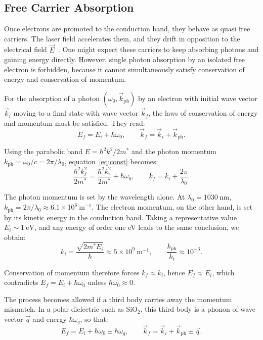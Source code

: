 \subsection{Free Carrier Absorption}

Once electrons are promoted to the conduction band, they behave as quasi free carriers. The laser field accelerates them, and they drift in opposition to the electrical field $\vec{E}$~\cite{mao2004}. One might expect these carriers to keep absorbing photons and gaining energy directly. However, single photon absorption by an isolated free electron is forbidden, because it cannot simultaneously satisfy conservation of energy and conservation of momentum.

For the absorption of a photon $(\omega_0,\vec{k}_{\text{ph}})$ by an electron with initial wave vector $\vec{k}_i$ moving to a final state with wave vector $\vec{k}_f$, the laws of conservation of energy and momentum must be satisfied. They read:
\begin{equation}
  E_f = E_i + \hbar\omega_0 , \qquad \vec{k}_f = \vec{k}_i + \vec{k}_{\text{ph}}.
  \label{eq:const}
\end{equation}

Using the parabolic band $E = \hbar^2 k^2 / 2m^\ast$ and the photon momentum $k_{\text{ph}} = \omega_0/c = 2\pi/\lambda_0$, equation~\eqref{eq:const} becomes:
\begin{equation}
  \frac{\hbar^2 k_f^2}{2m^\ast} = \frac{\hbar^2 k_i^2}{2m^\ast} + \hbar\omega_0 , \qquad k_f = k_i + \frac{2\pi}{\lambda_0}.
\end{equation}

The photon momentum is set by the wavelength alone. At $\lambda_0 = 1030~\mathrm{nm}$, $k_{\text{ph}} = 2\pi/\lambda_0 \approx 6.1\times10^{6}~\mathrm{m^{-1}}$. The electron momentum, on the other hand, is set by its kinetic energy in the conduction band. Taking a representative value $E_i \sim 1~\mathrm{eV}$, and any energy of order one eV leads to the same conclusion, we obtain:
\begin{equation}
  k_i = \frac{\sqrt{2 m^\ast E_i}}{\hbar} \approx 5\times10^{9}~\mathrm{m^{-1}}, \qquad \frac{k_{\text{ph}}}{k_i} \approx 10^{-3}.
\end{equation}

Conservation of momentum therefore forces $k_f \approx k_i$, hence $E_f \approx E_i$, which contradicts $E_f = E_i + \hbar\omega_0$ unless $\hbar\omega_0 \approx 0$.

The process becomes allowed if a third body carries away the momentum mismatch. In a polar dielectric such as $\mathrm{SiO_2}$, this third body is a phonon of wave vector $\vec{q}$ and energy $\hbar\omega_q$, so that:
\begin{equation}
  E_f = E_i + \hbar\omega_0 \pm \hbar\omega_q , \qquad \vec{k}_f = \vec{k}_i + \vec{k}_{\text{ph}} \pm \vec{q}.
\end{equation}


